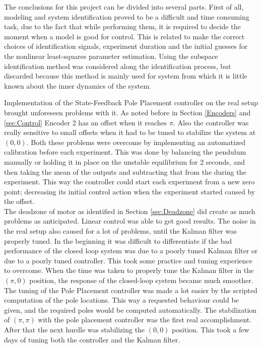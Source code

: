 \documentclass[main.tex]{subfiles}
\begin{document}
	
\vspace{20pt}

The conclusions for this project can be divided into several parts. First of all, modeling and system identification proved to be a difficult and time consuming task, due to the fact that while performing them, it is required to decide the moment when a model is good for control. This is related to make the correct choices of identification signals, experiment duration and the initial guesses for the nonlinear least-squares parameter estimation. Using the subspace identification method was considered along the identification process, but discarded because this method is mainly used for system from which it is little known about the inner dynamics of the system.



Implementation of the State-Feedback Pole Placement controller on the real setup brought unforeseen problems with it. As noted before in Section \ref{Encoders} and \ref{sec:Control} Encoder 2 has an offset when it reaches $\pi$. Also the controller was really sensitive to small offsets when it had to be tuned to stabilize the system at $(0,0)$. Both these problems were overcome by implementing an automatized calibration before each experiment. This was done by balancing the pendulum manually or holding it in place on the unstable equilibrium for 2 seconds, and then taking the mean of the outputs and subtracting that from the during the experiment. This way the controller could start each experiment from a new zero point; decreasing its initial control action when the experiment started caused by the offset. \\ 
The deadzone of motor as identified in Section \ref{sec:Deadzone} did create as much problems as anticipated. Linear control was able to get good results. 
The noise in the real setup also caused for a lot of problems, until the Kalman filter was properly tuned. In the beginning it was difficult to differentiate if the bad performance of the closed loop system was due to a poorly tuned Kalman filter or due to a poorly tuned controller. This took some practice and tuning experience to overcome. When the time was taken to properly tune the Kalman filter in the $(\pi,0)$ position, the response of the closed-loop system became much smoother. \\ 
The tuning of the Pole Placement controller was made a lot easier by the scripted computation of the pole locations. This way a requested behaviour could be given, and the required poles would be computed automatically. The stabilization of $(\pi,\pi)$ with the pole placement controller was the first real accomplishment. After that the next hurdle was stabilizing the $(0,0)$ position. This took a few days of tuning both the controller and the Kalman filter. \\
\end{document}
